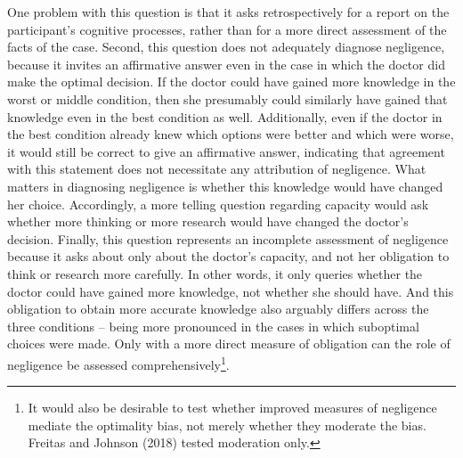 \documentclass[
  man,floatsintext]{apa6}
\begin{document}
One problem with this question is that it asks retrospectively for a report on the participant's cognitive processes, rather than for a more direct assessment of the facts of the case. Second, this question does not adequately diagnose negligence, because it invites an affirmative answer even in the case in which the doctor did make the optimal decision. If the doctor could have gained more knowledge in the worst or middle condition, then she presumably could similarly have gained that knowledge even in the best condition as well. Additionally, even if the doctor in the best condition already knew which options were better and which were worse, it would still be correct to give an affirmative answer, indicating that agreement with this statement does not necessitate any attribution of negligence. What matters in diagnosing negligence is whether this knowledge would have changed her choice. Accordingly, a more telling question regarding capacity would ask whether more thinking or more research would have changed the doctor's decision. Finally, this question represents an incomplete assessment of negligence because it asks about only about the doctor's capacity, and not her obligation to think or research more carefully. In other words, it only queries whether the doctor could have gained more knowledge, not whether she should have. And this obligation to obtain more accurate knowledge also arguably differs across the three conditions -- being more pronounced in the cases in which suboptimal choices were made. Only with a more direct measure of obligation can the role of negligence be assessed comprehensively\footnote{It would also be desirable to test whether improved measures of negligence mediate the optimality bias, not merely whether they moderate the bias. Freitas and Johnson (2018) tested moderation only.}.\\
\end{document}
